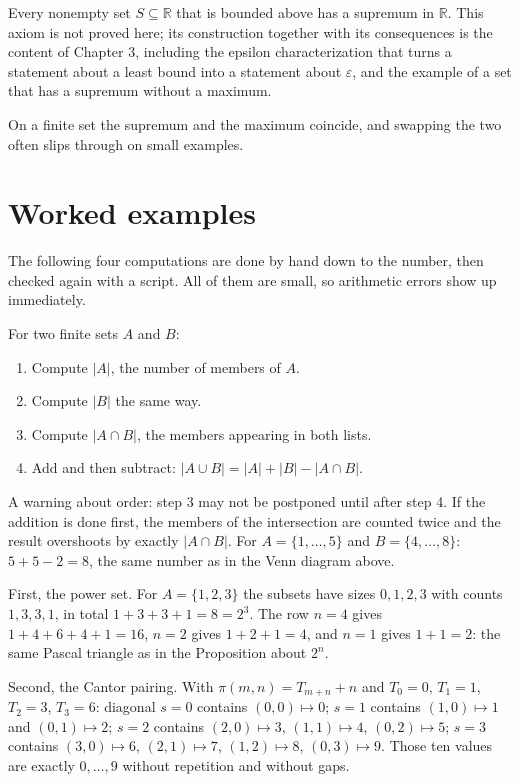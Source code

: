 \begin{catatan}
Every nonempty set $S \subseteq \mathbb{R}$ that is bounded above has a supremum in
$\mathbb{R}$. This axiom is not proved here; its construction together with its
consequences is the content of Chapter 3, including the epsilon characterization that
turns a statement about a least bound into a statement about $\varepsilon$, and the
example of a set that has a supremum without a maximum.
\end{catatan}

On a finite set the supremum and the maximum coincide, and swapping the two often
slips through on small examples.

\section{Worked examples}

The following four computations are done by hand down to the number, then checked
again with a script. All of them are small, so arithmetic errors show up immediately.

\begin{resep}
For two finite sets $A$ and $B$:
\begin{enumerate}
  \item Compute $|A|$, the number of members of $A$.
  \item Compute $|B|$ the same way.
  \item Compute $|A \cap B|$, the members appearing in both lists.
  \item Add and then subtract: $|A \cup B| = |A| + |B| - |A \cap B|$.
\end{enumerate}
A warning about order: step 3 may not be postponed until after step 4. If the addition
is done first, the members of the intersection are counted twice and the result
overshoots by exactly $|A \cap B|$. For $A = \{1,\dots,5\}$ and $B = \{4,\dots,8\}$:
$5 + 5 - 2 = 8$, the same number as in the Venn diagram above.
\end{resep}

First, the power set. For $A = \{1,2,3\}$ the subsets have sizes $0,1,2,3$ with counts
$1, 3, 3, 1$, in total $1 + 3 + 3 + 1 = 8 = 2^{3}$. The row $n = 4$ gives
$1+4+6+4+1 = 16$, $n = 2$ gives $1+2+1 = 4$, and $n = 1$ gives $1+1 = 2$: the same
Pascal triangle as in the Proposition about $2^{n}$.

Second, the Cantor pairing. With $\pi(m,n) = T_{m+n} + n$ and $T_0 = 0$, $T_1 = 1$,
$T_2 = 3$, $T_3 = 6$: diagonal $s = 0$ contains $(0,0) \mapsto 0$; $s = 1$ contains
$(1,0) \mapsto 1$ and $(0,1) \mapsto 2$; $s = 2$ contains $(2,0) \mapsto 3$,
$(1,1) \mapsto 4$, $(0,2) \mapsto 5$; $s = 3$ contains $(3,0) \mapsto 6$,
$(2,1) \mapsto 7$, $(1,2) \mapsto 8$, $(0,3) \mapsto 9$. Those ten values are exactly
$0, \dots, 9$ without repetition and without gaps.

